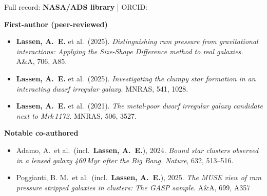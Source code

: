 
\begin{flushleft}
\small
\vspace{0.2em}
Full record:  {\textbf{NASA/ADS library}} 
\quad|\quad
ORCID: 

\vspace{0.4em}

\textbf{First-author (peer-reviewed)}

\begin{itemize}
  \item \textbf{Lassen, A.~E.} et al.\ (2025).
        \textit{Distinguishing ram pressure from gravitational interactions:
        Applying the Size-Shape Difference method to real galaxies.}
        A\&A, 706, A85.

  \item \textbf{Lassen, A.~E.} et al.\ (2025).
        \textit{Investigating the clumpy star formation in an interacting dwarf
        irregular galaxy.}
        MNRAS, 541, 1028.

  \item \textbf{Lassen, A.~E.} et al.\ (2021).
        \textit{The metal-poor dwarf irregular galaxy candidate next to Mrk\,1172.}
        MNRAS, 506, 3527.
\end{itemize}

\vspace{0.2em}
\textbf{Notable co-authored}

\begin{itemize}
  \item Adamo, A.\ et al.\ (incl.\ \textbf{Lassen, A.~E.}), 2024.
        \textit{Bound star clusters observed in a lensed galaxy 460\,Myr after
        the Big Bang.} \textit{Nature}, 632, 513--516.

  \item Poggianti, B. M.\ et al.\ (incl.\ \textbf{Lassen, A.~E.}), 2025.
        \textit{The MUSE view of ram pressure stripped galaxies in clusters: The GASP sample.}
        A\&A, 699, A357
\end{itemize}

\end{flushleft}
